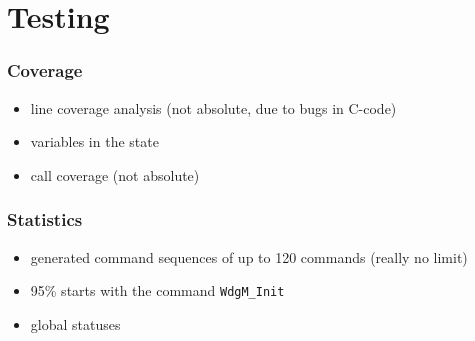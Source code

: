 \documentclass{beamer}
\begin{document}
\section{Testing}

\begin{frame}
  \frametitle{Coverage}
  \begin{itemize}
    \item line coverage analysis (not absolute, due to bugs in C-code)
    \item variables in the state
    \item call coverage (not absolute)
  \end{itemize}
\end{frame}


\begin{frame}[fragile]
  \frametitle{Statistics}
  \begin{itemize}
    \item generated command sequences of up to 120 commands (really no limit)
    \item 95\% starts with the command \verb!WdgM_Init!
    \item global statuses
  \end{itemize}
\end{frame}
\end{document}
